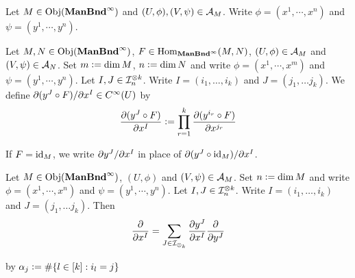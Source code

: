 \documentclass{book}
\begin{document}

\begin{defn} 
	Let $M \in \operatorname{Obj}(\operatorname*{\text{\textbf{ManBnd}}^{\infty}})$ and $(U, \phi), (V, \psi) \in \mathcal{A}_M$. Write $\phi = (x^1, \cdots, x^n)$ and $\psi = (y^1, \cdots, y^n)$. 
\end{defn}

\begin{defn} 
	Let $M, N \in \operatorname{Obj}(\operatorname*{\text{\textbf{ManBnd}}^{\infty}})$, $F \in \operatorname{Hom}_{\operatorname*{\text{\textbf{ManBnd}}^{\infty}}}(M, N)$, $(U, \phi) \in \mathcal{A}_M$ and $(V, \psi) \in \mathcal{A}_N$. Set $m \vcentcolon= \dim M$, $n \vcentcolon= \dim N$ and write $\phi = (x^1, \cdots, x^m)$ and $\psi = (y^1, \cdots, y^n)$. Let $I, J \in \mathcal{I}_n^{\otimes k}$. Write $I = (i_1, \ldots, i_k)$ and $J = (j_1, \ldots j_k)$. We define $\partial (y^J \circ F)/ \partial x^I \in C^{\infty}(U)$ by 
	$$\frac{\partial (y^J \circ F)}{\partial x^I} \vcentcolon= \prod\limits_{r =1}^k \frac{\partial (y^{i_r} \circ F)}{\partial x^{j_r}}$$
\end{defn}

\begin{note}
	If $F = \operatorname{id}_M$, we write $\partial y^J/\partial x^I$ in place of $\partial (y^J \circ \operatorname{id}_M) / \partial x^I$.
\end{note}

\begin{ex} 
	Let $M \in \operatorname{Obj}(\operatorname*{\text{\textbf{ManBnd}}^{\infty}})$, $(U, \phi)$ and $(V, \psi) \in \mathcal{A}_M$. Set $n \vcentcolon= \dim M$ and write $\phi = (x^1, \cdots, x^n)$ and $\psi = (y^1, \cdots, y^n)$. Let $I, J \in \mathcal{I}_n^{\otimes k}$. Write $I = (i_1, \ldots, i_k)$ and $J = (j_1, \ldots j_k)$. Then 
	$$\frac{\partial }{ \partial x^I} = \sum_{J \in \mathcal{I}_{\otimes_k}} \frac{\partial y^J}{\partial x^I} \frac{\partial }{\partial y^J}$$
\end{ex}

 by $\alpha_j \vcentcolon= \# \{l \in [k]: i_l = j\}$
\end{document}
